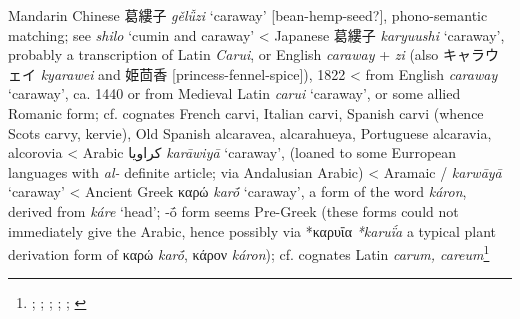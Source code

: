 \begin{etymology}\label{ety:geluzi}
Mandarin Chinese {葛縷子} \textit{gě​lǚ​zi} `caraway' [bean-hemp-seed?], phono-semantic matching; see \textit{shilo} `cumin and caraway'
< Japanese {葛縷子} \textit{karyuushi} `caraway', probably a transcription of Latin \textit{Carui}, or English \textit{caraway} + \textit{zi} (also キャラウェイ \textit{kyarawei} and 姫茴香 [princess-fennel-spice]), 1822
< from English \textit{caraway} `caraway', ca. 1440
 or from Medieval Latin \textit{carui} `caraway', or some allied Romanic form; cf. cognates French carvi, Italian carvi, Spanish carvi (whence Scots carvy, kervie), Old Spanish alcaravea, alcarahueya, Portuguese alcaravia, alcorovia
< Arabic {كراويا} \textit{karāwiyā} `caraway', (loaned to some Eurropean languages with \textit{al-} definite article; via Andalusian Arabic)
< Aramaic {/} \textit{karwāyā} `caraway'
< Ancient Greek {καρώ} \textit{karṓ} `caraway', a form of the word \textit{káron}, derived from \textit{káre} `head'; -ṓ form seems Pre-Greek (these forms could not immediately give the Arabic, hence possibly via *καρυΐα \textit{*karuḯa} a typical plant derivation form of καρώ \textit{karṓ}, κάρον \textit{káron}); cf. cognates Latin \textit{carum, careum}\footnote{\textcite[100]{kleeman_oxford_2010}; \textcite[s.v. caraway]{oed}; \textcite[s.v. caraway]{ahd}; \textcite[74]{corriente_dictionary_2008}; \textcites[207]{low_aramaeische_1881}[437-438]{low_flora_1924}; \textcites[653]{beekes_etymological_2010}[599]{sokoloff_dictionary_2002}}
\end{etymology}